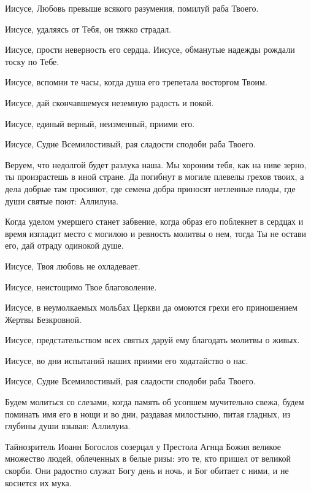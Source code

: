 \begin{mymulticols}
Иисусе, Любовь превыше всякого разумения, помилуй раба Твоего. 

Иисусе, удаляясь от Тебя, он тяжко страдал. 

Иисусе, прости неверность его сердца. Иисусе, обманутые надежды рождали тоску по Тебе. 

Иисусе, вспомни те часы, когда душа его трепетала восторгом Твоим. 

Иисусе, дай скончавшемуся неземную радость и покой. 

Иисусе, единый верный, неизменный, приими его. 

Иисусе, Судие Всемилостивый, рая сладости сподоби раба Твоего.




Веруем, что недолгой будет разлука наша. Мы хороним тебя, как на ниве зерно, ты произрастешь в иной стране. Да погибнут в могиле плевелы грехов твоих, а дела добрые там просияют, где семена добра приносят нетленные плоды, где души святые поют: Аллилуиа.




Когда уделом умершего станет забвение, когда образ его поблекнет в сердцах и время изгладит место с могилою и ревность молитвы о нем, тогда Ты не остави его, дай отраду одинокой душе. 

Иисусе, Твоя любовь не охладевает. 

Иисусе, неистощимо Твое благоволение. 

Иисусе, в неумолкаемых мольбах Церкви да омоются грехи его приношением Жертвы Безкровной. 

Иисусе, предстательством всех святых даруй ему благодать молитвы о живых. 

Иисусе, во дни испытаний наших приими его ходатайство о нас. 

Иисусе, Судие Всемилостивый, рая сладости сподоби раба Твоего.




Будем молиться со слезами, когда память об усопшем мучительно свежа, будем поминать имя его в нощи и во дни, раздавая милостыню, питая гладных, из глубины души взывая: Аллилуиа.




Тайнозритель Иоанн Богослов созерцал у Престола Агнца Божия великое множество людей, облеченных в белые ризы: это те, кто пришел от великой скорби. Они радостно служат Богу день и ночь, и Бог обитает с ними, и не коснется их мука. 


\end{mymulticols}
